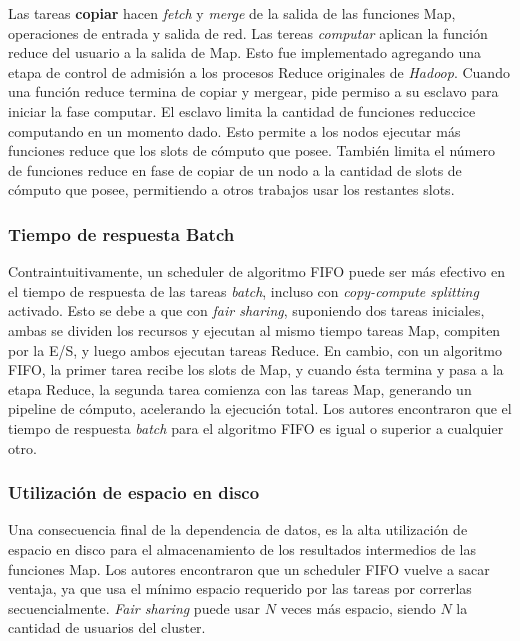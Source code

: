 \vspace{2mm} 

Las tareas \textbf{copiar} hacen \emph{fetch} y \emph{merge} de la salida de las funciones Map, operaciones de entrada y salida de red. Las tereas \emph{computar} aplican la funci\'on reduce del usuario a la salida de Map. Esto fue implementado agregando una etapa de control de admisi\'on a los procesos Reduce originales de \emph{Hadoop}. Cuando una funci\'on reduce termina de copiar y mergear, pide permiso a su esclavo para iniciar la fase computar. El esclavo limita la cantidad de funciones reduccice computando en un momento dado. Esto permite a los nodos ejecutar m\'as funciones reduce que los slots de c\'omputo que posee. Tambi\'en limita el n\'umero de funciones reduce en fase de copiar de un nodo a la cantidad de slots de c\'omputo que posee, permitiendo a otros trabajos usar los restantes slots.

\vspace{2mm} 

\subsubsection{Tiempo de respuesta Batch}

Contraintuitivamente, un scheduler de algoritmo FIFO puede ser m\'as efectivo en el tiempo de respuesta de las tareas \emph{batch}, incluso con \emph{copy-compute splitting} activado. Esto se debe a que con \emph{fair sharing}, suponiendo dos tareas iniciales, ambas se dividen los recursos y ejecutan al mismo tiempo tareas Map, compiten por la E/S, y luego ambos ejecutan tareas Reduce. En cambio, con un algoritmo FIFO, la primer tarea recibe los slots de Map, y cuando \'esta termina y pasa a la etapa Reduce, la segunda tarea comienza con las tareas Map, generando un pipeline de c\'omputo, acelerando la ejecuci\'on total. Los autores encontraron que el tiempo de respuesta \emph{batch} para el algoritmo FIFO es igual o superior a cualquier otro.

\subsubsection{Utilizaci\'on de espacio en disco}

Una consecuencia final de la dependencia de datos, es la alta utilizaci\'on de espacio en disco para el almacenamiento de los resultados intermedios de las funciones Map. Los autores encontraron que un scheduler FIFO vuelve a sacar ventaja, ya que usa el m\'inimo espacio requerido por las tareas por correrlas secuencialmente. \emph{Fair sharing} puede usar $N$ veces m\'as espacio, siendo $N$ la cantidad de usuarios del cluster.

